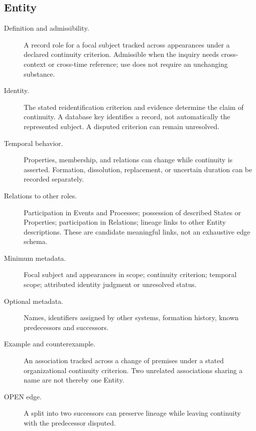 \documentclass[11pt,a4paper]{article}
\begin{document}
\subsection{Entity}
\begin{description}
\item[Definition and admissibility.] A record role for a focal subject tracked across appearances under a declared continuity criterion. Admissible when the inquiry needs cross-context or cross-time reference; use does not require an unchanging substance.
\item[Identity.] The stated reidentification criterion and evidence determine the claim of continuity. A database key identifies a record, not automatically the represented subject. A disputed criterion can remain unresolved.
\item[Temporal behavior.] Properties, membership, and relations can change while continuity is asserted. Formation, dissolution, replacement, or uncertain duration can be recorded separately.
\item[Relations to other roles.] Participation in Events and Processes; possession of described States or Properties; participation in Relations; lineage links to other Entity descriptions. These are candidate meaningful links, not an exhaustive edge schema.
\item[Minimum metadata.] Focal subject and appearances in scope; continuity criterion; temporal scope; attributed identity judgment or unresolved status.
\item[Optional metadata.] Names, identifiers assigned by other systems, formation history, known predecessors and successors.
\item[Example and counterexample.] An association tracked across a change of premises under a stated organizational continuity criterion. Two unrelated associations sharing a name are not thereby one Entity.
\item[OPEN edge.] A split into two successors can preserve lineage while leaving continuity with the predecessor disputed.
\end{description}
\end{document}
